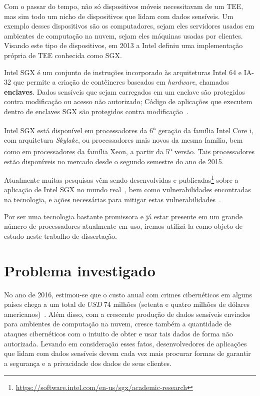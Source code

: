 Com o passar do tempo, não só dispositivos móveis necessitavam de um TEE, mas
sim todo um nicho de dispositivos que lidam com dados sensíveis. Um exemplo
desses dispositivos são os computadores, sejam eles servidores usados em
ambientes de computação na nuvem, sejam eles máquinas usadas por clientes.
Visando este tipo de dispositivos, em 2013 a Intel definiu uma implementação
própria de TEE conhecida como SGX.


Intel SGX é um conjunto de instruções incorporado às arquiteturas Intel 64 e
IA-32 que permite a criação de contêineres baseados em \textit{hardware},
chamados \textbf{enclaves}. Dados sensíveis que sejam carregados em um enclave são
protegidos contra modificação ou acesso não autorizado; Código de aplicações que
executem dentro de enclaves SGX são protegidos contra modificação~\cite
{mckeen2013innovative}.

Intel SGX está disponível em processadores da 6\textsuperscript{a} geração da
família Intel Core i, com arquitetura \textit{Skylake}, ou processadores mais
novos da mesma família, bem como em processadores da família Xeon, a partir da 5\textsuperscript{a} versão. Tais processadores estão disponíveis no mercado desde o segundo semestre do ano de  2015.

Atualmente muitas pesquisas vêm sendo desenvolvidas e publicadas\footnote{\url{https://software.intel.com/en-us/sgx/academic-research}} sobre a
aplicação de Intel SGX no mundo real~\cite{hoekstra2013using}, bem como
vulnerabilidades encontradas na tecnologia, e ações necessárias para mitigar estas vulnerabilidades~\cite{swami2017intel}.

Por ser uma tecnologia bastante promissora e já estar presente em um grande
número de processadores atualmente em uso, iremos utilizá-la como objeto de
estudo neste trabalho de dissertação.

\section{Problema investigado}
\label{sec:intro_problema_investigado}

No ano de 2016, estimou-se que o custo anual com crimes cibernéticos em alguns
países chega a um total de $USD\ 74$ milhões (setenta e quatro milhões de
dólares americanos)~\cite{costcybercrime2016}. Além disso, com a crescente produção de
dados sensíveis enviados para ambientes de computação na nuvem, cresce também a
quantidade de ataques cibernéticos com o intuito de obter e usar tais dados de
forma não autorizada. Levando em consideração esses fatos, desenvolvedores de
aplicações que lidam com dados sensíveis devem cada vez mais procurar formas de
garantir a segurança e a privacidade dos dados de seus clientes.

